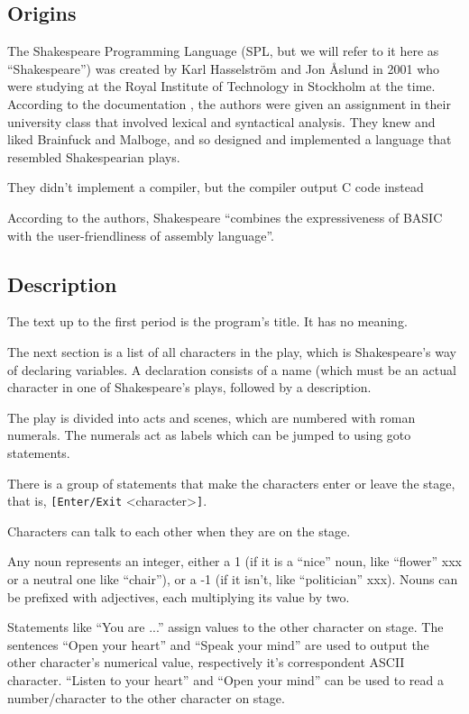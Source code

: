\subsection{Origins}

The Shakespeare Programming Language (SPL, but we will refer to it here as “Shakespeare”) was created by Karl Hasselström and Jon Åslund in 2001 who were studying at the Royal Institute of Technology in Stockholm at the time. According to the documentation \cite{...}, the authors were given an assignment in their university class that involved lexical and syntactical analysis. They knew and liked Brainfuck and Malboge, and so designed and implemented a language that resembled Shakespearian plays.

They didn't implement a compiler, but the compiler output C code instead

According to the authors, Shakespeare “combines the expressiveness of BASIC with the user-friendliness of assembly language”.

\subsection{Description}

The text up to the first period is the program's title. It has no meaning.

The next section is a list of all characters in the play, which is Shakespeare's way of declaring variables. A declaration consists of a name (which must be an actual character in one of Shakespeare's plays, followed by a description.

The play is divided into acts and scenes, which are numbered with roman numerals. The numerals act as labels which can be jumped to using goto statements.

There is a group of statements that make the characters enter or leave the stage, that is, \texttt{[Enter/Exit} <character>\texttt{]}.

Characters can talk to each other when they are on the stage.

Any noun represents an integer, either a 1 (if it is a “nice” noun, like “flower” xxx or a neutral one like “chair”), or a -1 (if it isn't, like “politician” xxx). Nouns can be prefixed with adjectives, each multiplying its value by two.

Statements like “You are ...” assign values to the other character on stage. The sentences “Open your heart” and “Speak your mind” are used to output the other character's numerical value, respectively it's correspondent ASCII character. “Listen to your heart” and “Open your mind” can be used to read a number/character to the other character on stage.


